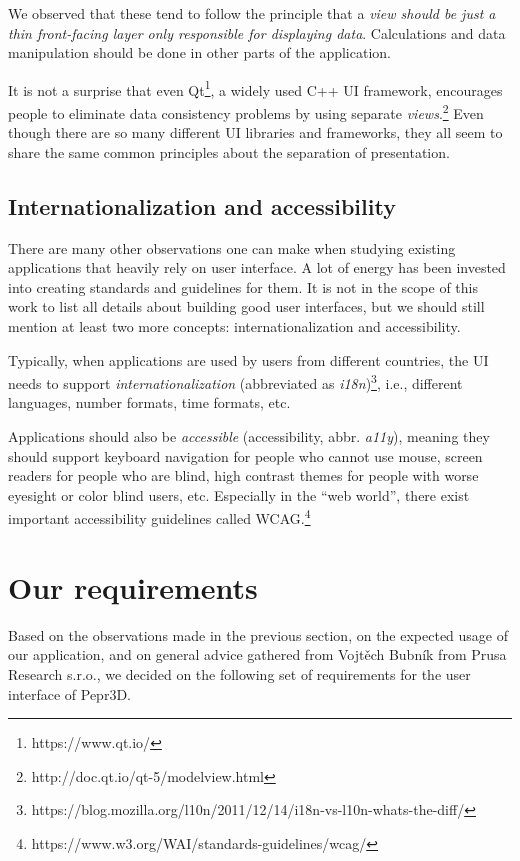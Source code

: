 We observed that these tend to follow the principle that a \emph{view should be just a thin front-facing layer only responsible for displaying data}.
Calculations and data manipulation should be done in other parts of the application.

It is not a surprise that even Qt\footnote{https://www.qt.io/}, a widely used C++ UI framework, encourages people to eliminate data consistency problems by using separate \emph{views}.\footnote{http://doc.qt.io/qt-5/modelview.html}
Even though there are so many different UI libraries and frameworks, they all seem to share the same common principles about the separation of presentation.

\subsection{Internationalization and accessibility}

There are many other observations one can make when studying existing applications that heavily rely on user interface.
A lot of energy has been invested into creating standards and guidelines for them.
It is not in the scope of this work to list all details about building good user interfaces, but we should still mention at least two more concepts: internationalization and accessibility.

Typically, when applications are used by users from different countries, the UI needs to support \emph{internationalization} (abbreviated as \emph{i18n})\footnote{https://blog.mozilla.org/l10n/2011/12/14/i18n-vs-l10n-whats-the-diff/}, i.e., different languages, number formats, time formats, etc.

Applications should also be \emph{accessible} (accessibility, abbr. \emph{a11y}), meaning they should support keyboard navigation for people who cannot use mouse, screen readers for people who are blind, high contrast themes for people with worse eyesight or color blind users, etc.
Especially in the ``web world'', there exist important accessibility guidelines called WCAG.\footnote{https://www.w3.org/WAI/standards-guidelines/wcag/}

\section{Our requirements}\label{sec:uireqs}

Based on the observations made in the previous section, on the expected usage of our application, and on general advice gathered from Vojtěch Bubník from Prusa Research s.r.o., we decided on the following set of requirements for the user interface of Pepr3D.

